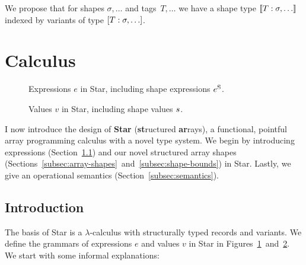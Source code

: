 We propose that for shapes $\sigma, \dots$ and tags~$T, \dots$ we have a shape type $\sconcattype{T : \sigma, \dots}$ indexed by variants of type $\svarianttype{T : \sigma, \dots}$.

\section{Calculus}
\label{sec:calculus}

\begin{figure}
    \centering
    
    \caption{Expressions $e$ in Star, including shape expressions ${e^\mathrm{S}}$.}
    \label{fig:star-expressions}
\end{figure}

\begin{figure}
    \centering
    
    \caption{Values $v$ in Star, including shape values $s$.}
    \label{fig:star-values}
\end{figure}

I now introduce the design of \textbf{Star} (\textbf{st}ructured \textbf{ar}rays), a functional, pointful array programming calculus with a novel type system. We begin by introducing expressions (Section~\ref{subsec:star-intro}) and our novel structured array shapes (Sections~\ref{subsec:array-shapes}~and~\ref{subsec:shape-bounds}) in Star.
Lastly, we give an operational semantics  (Section~\ref{subsec:semantics}).

\subsection{Introduction}
\label{subsec:star-intro}

The basis of Star is a $\lambda$-calculus with structurally typed records and variants. We define the grammars of expressions $e$ and values $v$ in Star in Figures~\ref{fig:star-expressions}~and~\ref{fig:star-values}.
We start with some informal explanations:

